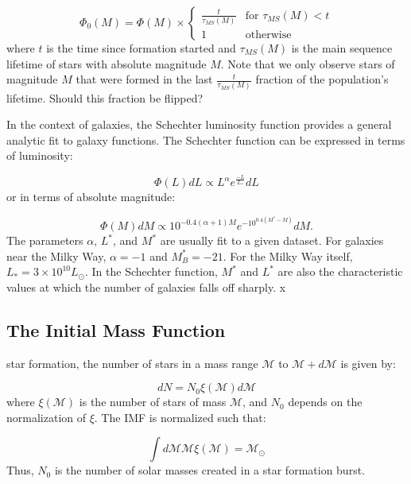  \begin{equation}
\Phi_0(M) = \Phi(M) \times
\begin{cases}
\frac{t}{\tau_{MS}(M)} & \text{for } \tau_{MS}(M)<t \\
1 & \text{otherwise}
\end{cases}
\end{equation} 
where $t$ is the time since formation started and $\tau_{MS}(M)$ is the main
sequence lifetime of stars with absolute magnitude $M$. Note that we only
observe stars of magnitude $M$ that were formed in the last
$\frac{t}{\tau_{MS}(M)}$ fraction of the population's lifetime.  Should this 
fraction be flipped?

In the context of galaxies, the Schechter luminosity function provides a general analytic fit to galaxy functions. The Schechter function can be expressed in terms of luminosity:

\begin{equation}
\Phi(L) dL \propto L^\alpha  e^{\frac{-L}{L_*}} dL
\end{equation}
or in terms of absolute magnitude:

\begin{equation}
\Phi(M) dM \propto 10^{-0.4(\alpha+1)M} e^{-10^{0.4(M^*-M)}} dM.
 \end{equation}
 The parameters $\alpha$, $L^*$, and $M^*$ are usually fit to a given dataset. For galaxies near the Milky Way, $\alpha = -1$ and $M^*_B = -21$. For the Milky Way itself, $L_* = 3\times 10^{10} L_\odot$. In the Schechter function, $M^*$ and $L^*$ are also the characteristic values at which the number of galaxies falls off sharply. x 

\subsection{The Initial Mass Function}

 star formation, the number of stars in a
mass range $\mathcal{M}$ to $\mathcal{M}+d\mathcal{M}$ is given by:

\begin{equation}
dN = N_0 \xi(\mathcal{M}) d\mathcal{M}
\end{equation}
where $\xi(\mathcal{M})$ is the number of stars of mass $\mathcal{M}$, and $N_0$ depends on the normalization of $\xi$. The IMF is normalized such that:

\begin{equation}
\int d\mathcal{M} \mathcal{M} \xi(\mathcal{M}) = \mathcal{M}_\odot
\end{equation}
Thus, $N_0$ is the number of solar masses created in a star formation burst. 

